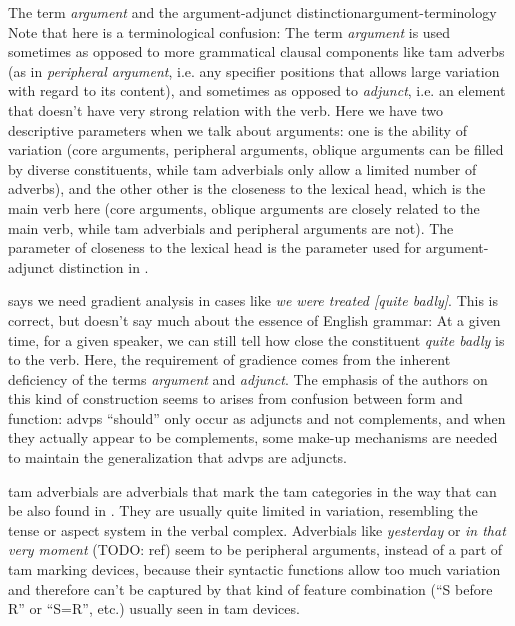 \documentclass[UTF8, a4paper, oneside, scheme=plain]{ctexrep}
\newcommand*{\citepage}[1]{p.~{#1}}
\newcommand*{\term}[1]{\emph{#1}}
\newcommand{\corpus}[1]{\emph{#1}}
\begin{document}
\begin{infobox}{The term \term{argument} and the argument-adjunct distinction}{argument-terminology}
    Note that here is a terminological confusion:
    The term \term{argument} is used sometimes 
    as opposed to more grammatical clausal components like \acs{tam} adverbs
    (as in \term{peripheral argument}, 
    i.e. any specifier positions that allows large variation with regard to its content),
    and sometimes as opposed to \term{adjunct},
    i.e. an element that doesn't have very strong relation with the verb.
    Here we have two descriptive parameters when we talk about arguments:
    one is the ability of variation
    (core arguments, peripheral arguments, oblique arguments can be filled by diverse constituents,
    while \acs{tam} adverbials only allow a limited number of adverbs),
    and the other other is the closeness to the lexical head, which is the main verb here 
    (core arguments, oblique arguments are closely related to the main verb,
    while \acs{tam} adverbials and peripheral arguments are not).
    The parameter of closeness to the lexical head is the parameter used for argument-adjunct distinction
    in .

    \citet[\citepage{732}]{quirk1985} says we need gradient analysis 
    in cases like \corpus{we were treated [quite badly]}.
    This is correct, but doesn't say much about the essence of English grammar:
    At a given time, for a given speaker,
    we can still tell how close the constituent \corpus{quite badly} is to the verb.
    Here, the requirement of gradience 
    comes from the inherent deficiency of the terms \term{argument} and \term{adjunct}. 
    The emphasis of the authors on this kind of construction 
    seems to arises from confusion between form and function:
    \acs{advp}s ``should'' only occur as adjuncts and not complements,
    and when they actually appear to be complements,
    some make-up mechanisms are needed to maintain the generalization that \acs{advp}s are adjuncts.
\end{infobox}

\acs{tam} adverbials are adverbials that mark the \acs{tam} categories 
in the way that can be also found in .
They are usually quite limited in variation,
resembling the tense or aspect system in the verbal complex.
Adverbials like \corpus{yesterday} or \corpus{in that very moment} (TODO: ref)
seem to be peripheral arguments, instead of a part of \acs{tam} marking devices,
because their syntactic functions allow too much variation 
and therefore can't be captured by that kind of feature combination 
(``S before R'' or ``S=R'', etc.)
usually seen in \acs{tam} devices. 
\end{document}
